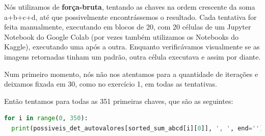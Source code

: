 \documentclass[a4paper, 12pt]{article}
\begin{document}
Nós utilizamos de \textbf{força-bruta}, tentando as chaves na ordem crescente da soma a+b+c+d, até que possivelmente encontrássemos o resultado. Cada tentativa for feita manualmente, executando em blocos de 20, com 20 células de um Jupyter Notebook do Google Colab (por vezes também utilizamos os Notebooks do Kaggle), executando uma após a outra. Enquanto verificávamos visualmente se as imagens retornadas tinham um padrão, outra célula executava e assim por diante.

Num primeiro momento, nós não nos atentamos para a quantidade de iterações e deixamos fixada em 30, como no exercício 1, em todas as tentativas.

Então tentamos para todas as 351 primeiras chaves, que são as seguintes:

\begin{lstlisting}[language=Python, caption = 351 chaves tentadas num primeiro momento.]
for i in range(0, 350):
  print(possiveis_det_autovalores[sorted_sum_abcd[i][0]], ', ', end='')
\end{lstlisting}
\end{document}
